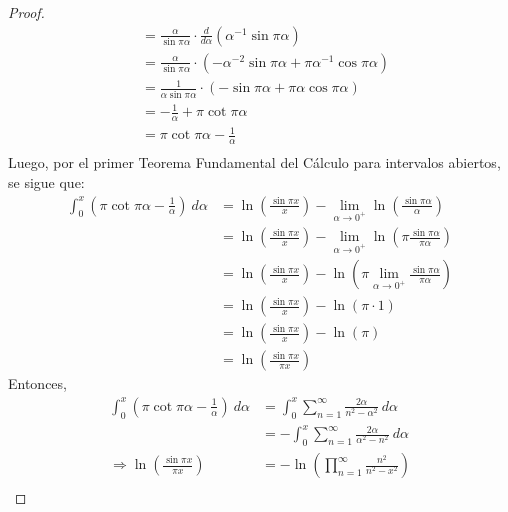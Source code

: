 \documentclass[12pt]{report}
\newcounter{it}
\theoremstyle{largebreak}
\begin{document}
\begin{proof}
\begin{equation*}
\begin{split}
                &=\frac{\alpha}{\sin \pi\alpha}\cdot\frac{d}{d\alpha}\left(\alpha^{-1}\sin \pi\alpha\right)\\
                &=\frac{\alpha}{\sin \pi\alpha}\cdot\left(-\alpha^{-2}\sin\pi\alpha+\pi\alpha^{-1}\cos\pi\alpha\right)\\
                &=\frac{1}{\alpha\sin \pi\alpha}\cdot\left(-\sin\pi\alpha+\pi\alpha\cos\pi\alpha\right)\\
                &=-\frac{1}{\alpha}+\pi\cot\pi\alpha\\
                &=\pi\cot\pi\alpha-\frac{1}{\alpha}\\
            \end{split}
        \end{equation*}
        Luego, por el primer Teorema Fundamental del Cálculo para intervalos abiertos, se sigue que:
        \begin{equation*}
            \begin{split}
                \int_0^x\left(\pi\cot\pi\alpha-\frac{1}{\alpha}\right)\:d\alpha&=\ln\left(\frac{\sin \pi x}{x}\right)-\lim_{\alpha\rightarrow0^+}\ln\left(\frac{\sin \pi\alpha}{\alpha}\right)\\
                &=\ln\left(\frac{\sin \pi x}{x}\right)-\lim_{\alpha\rightarrow0^+}\ln\left(\pi\frac{\sin \pi\alpha}{\pi\alpha}\right)\\
                &=\ln\left(\frac{\sin \pi x}{x}\right)-\ln\left(\pi\lim_{\alpha\rightarrow0^+}\frac{\sin \pi\alpha}{\pi\alpha}\right)\\
                &=\ln\left(\frac{\sin \pi x}{x}\right)-\ln\left(\pi\cdot1\right)\\
                &=\ln\left(\frac{\sin \pi x}{x}\right)-\ln(\pi)\\
                &=\ln\left(\frac{\sin \pi x}{\pi x}\right)
            \end{split}
        \end{equation*}
        Entonces,
        \begin{equation*}
            \begin{split}
                \int_0^x\left(\pi\cot\pi\alpha-\frac{1}{\alpha}\right)\:d\alpha&=\int_0^x\sum_{ n=1}^\infty\frac{2\alpha}{n^2-\alpha^2}\:d\alpha\\
                &=-\int_0^x\sum_{ n=1}^\infty\frac{2\alpha}{\alpha^2-n^2}\:d\alpha\\
                \Rightarrow \ln\left(\frac{\sin \pi x}{\pi x}\right)&=-\ln\left(\prod_{ n=1}^\infty\frac{n^2}{n^2-x^2}\right)\\

\end{split}
\end{equation*}
\end{proof}
\end{document}
